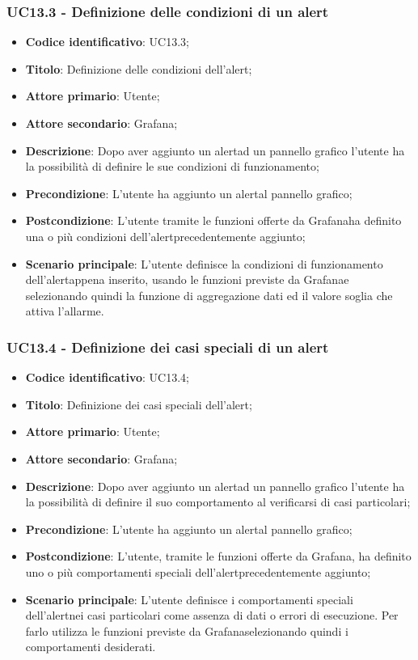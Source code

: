 \subsubsection{UC13.3 - Definizione delle condizioni di un alert}
\begin{itemize}
	\item \textbf{Codice identificativo}: UC13.3;
	\item \textbf{Titolo}: Definizione delle condizioni dell'alert\glo;
	\item \textbf{Attore primario}: Utente;
	\item \textbf{Attore secondario}: Grafana\glo;
	\item \textbf{Descrizione}: Dopo aver aggiunto un alert\glosp ad un pannello grafico l'utente ha la possibilità di definire le sue condizioni di funzionamento;
	\item \textbf{Precondizione}: L'utente ha aggiunto un alert\glosp al pannello grafico;
	\item \textbf{Postcondizione}: L'utente tramite le funzioni offerte da Grafana\glosp ha definito una o più condizioni dell'alert\glosp precedentemente aggiunto;
	\item \textbf{Scenario principale}: L'utente definisce la condizioni di funzionamento dell'alert\glosp appena inserito, usando le funzioni previste da Grafana\glosp e selezionando quindi la funzione di aggregazione dati ed il valore soglia che attiva l'allarme.
\end{itemize}

\subsubsection{UC13.4 - Definizione dei casi speciali di un alert}
	\begin{itemize}
	\item \textbf{Codice identificativo}: UC13.4;
	\item \textbf{Titolo}: Definizione dei casi speciali dell'alert\glo;
	\item \textbf{Attore primario}: Utente;
	\item \textbf{Attore secondario}: Grafana\glo;
	\item \textbf{Descrizione}: Dopo aver aggiunto un alert\glosp ad un pannello grafico l'utente ha la possibilità di definire il suo comportamento al verificarsi di casi particolari;
	\item \textbf{Precondizione}: L'utente ha aggiunto un alert\glosp al pannello grafico;
	\item \textbf{Postcondizione}: L'utente, tramite le funzioni offerte da Grafana\glosp, ha definito uno o più comportamenti speciali dell'alert\glosp precedentemente aggiunto;
	\item \textbf{Scenario principale}: L'utente definisce i comportamenti speciali dell'alert\glosp nei casi particolari come assenza di dati o errori di esecuzione. Per farlo utilizza le funzioni previste da Grafana\glosp selezionando quindi i comportamenti desiderati.
\end{itemize} 